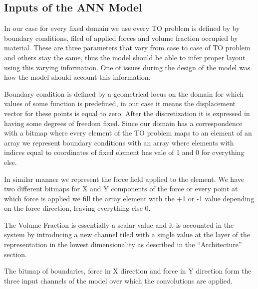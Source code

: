 

\subsection{Inputs of the ANN Model}

In our case for every fixed domain we use every TO problem is defined by by boundary conditions, filed of applied forces and volume fraction occupied by material. 
These are three parameters that vary from case to case of TO problem and others stay the same, thus the model should be able to infer proper layout using this varying information.
One of issues during the design of the model was how the model should account this information.
\medskip

Boundary condition is defined by a geometrical locus on the domain for which values of some function is predefined, in our case it means the displacement vector for these points is equal to zero. 
After the discretization it is expressed in having some degrees of freedom fixed. 
Since our domain has a correspondence with a bitmap where every element of the TO problem maps to an element of an array we represent boundary conditions with an array where elements with indices equal to coordinates of fixed element has vale of {1} and {0} for everything else.
\medskip

In similar manner we represent the force field applied to the element.
We have two different bitmaps for {X} and {Y} components of the force or every point at which force is applied we fill the array element with the {+1} or {-1} value depending on the force direction, leaving everything else {0}.
\medskip

The Volume Fraction is essentially a scalar value and it is accounted in the system by introducing a new channel tiled with a single value at the layer of the representation in the lowest dimensionality as described in the ``Architecture'' section.
\medskip

The bitmap of boundaries, force in X direction and force in Y direction form the three input channels of the model over which the convolutions are applied.
\medskip

